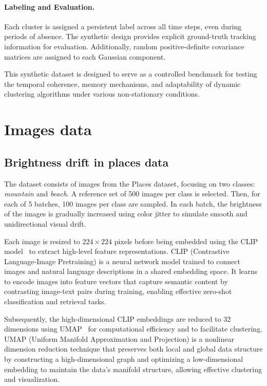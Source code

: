 \paragraph{Labeling and Evaluation.} Each cluster is assigned a persistent label across all time steps, even during
periods of absence. The synthetic design provides explicit ground-truth
tracking information for evaluation. Additionally, random positive-definite
covariance matrices are assigned to each Gaussian component.

This synthetic dataset is designed to serve as a controlled benchmark for
testing the temporal coherence, memory mechanisms, and adaptability of dynamic
clustering algorithms under various non-stationary conditions.

\section{Images data}\label{sec:images_data}

\subsection{Brightness drift in places data}\label{subsec:brightness}

The dataset consists of images from the Places dataset, focusing on two
classes: \emph{mountain} and \emph{beach}. A reference set of 500 images per
class is selected. Then, for each of 5 batches, 100 images per class are
sampled. In each batch, the brightness of the images is gradually increased
using color jitter to simulate smooth and unidirectional visual drift.

Each image is resized to \(224 \times 224\) pixels before being embedded using
the CLIP model~\cite{clip} to extract high-level feature representations. CLIP
(Contrastive Language-Image Pretraining) is a neural network model trained to
connect images and natural language descriptions in a shared embedding space.
It learns to encode images into feature vectors that capture semantic content
by contrasting image-text pairs during training, enabling effective zero-shot
classification and retrieval tasks.

Subsequently, the high-dimensional CLIP embeddings are reduced to 32 dimensions
using UMAP~\cite{umap} for computational efficiency and to facilitate
clustering. UMAP (Uniform Manifold Approximation and Projection) is a nonlinear
dimension reduction technique that preserves both local and global data
structure by constructing a high-dimensional graph and optimizing a
low-dimensional embedding to maintain the data’s manifold structure, allowing
effective clustering and visualization.

